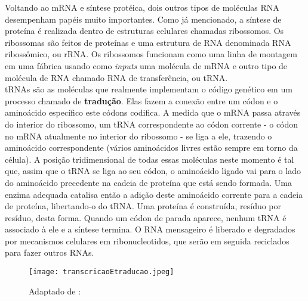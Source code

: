\indent Voltando ao mRNA e síntese protéica, dois outros tipos de moléculas RNA desempenham papéis muito importantes. Como já mencionado, a síntese de proteína é realizada dentro de estruturas celulares chamadas ribossomos. Os ribossomas são feitos de proteínas e uma estrutura de RNA denominada RNA ribossômico, ou rRNA. Os ribossomos funcionam como uma linha de montagem em uma fábrica usando como \textit{inputs} uma molécula de mRNA e outro tipo de molécula de RNA chamado RNA de transferência, ou tRNA. \\

\indent tRNAs são as moléculas que realmente implementam o código genético em um processo chamado de \textbf{tradução}. Elas fazem a conexão entre um códon e o aminoácido específico este códons codifica. A medida que o mRNA passa através do interior do ribossomo, um tRNA correspondente ao códon corrente - o códon no mRNA atualmente no interior do ribossomo - se liga a ele, trazendo o aminoácido correspondente (vários aminoácidos livres estão sempre em torno da célula). A posição tridimensional de todas essas moléculas neste momento é tal que, assim que o tRNA se liga ao seu códon, o aminoácido ligado vai para o lado do aminoácido precedente na cadeia de proteína que está sendo formada. Uma enzima adequada catalisa então a adição deste aminoácido corrente para a cadeia de proteína, libertando-o do tRNA. Uma proteína é construída, resíduo por resíduo, desta forma. Quando um códon de parada aparece, nenhum tRNA é associado à ele e a síntese termina. O RNA mensageiro é liberado e degradados por mecanismos celulares em ribonucleotidos, que serão em seguida reciclados para fazer outros RNAs. \\




\cite{setubal97}






\begin{figure}[h]
    \centering
    \texttt{[image: transcricaoEtraducao.jpeg]}
    \caption{Adaptado de : \cite{proteinSyntesis}}
    \label{fig:transcricaoEtraducao}
\end{figure}




